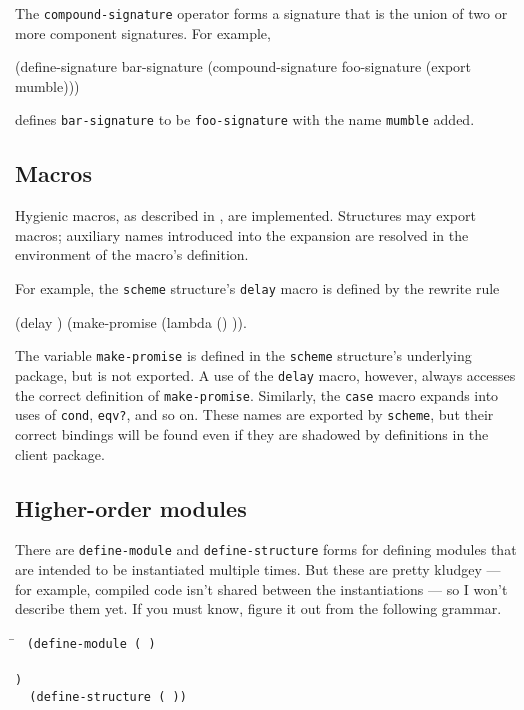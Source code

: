 The {\tt compound-signature} operator forms a signature that is the
union of two or more component signatures.  For example,
\begin{code}
    (define-signature bar-signature
      (compound-signature foo-signature (export mumble)))
\end{code}
defines {\tt bar-signature} to be {\tt foo-signature} with the name
{\tt mumble} added.


\subsection*{Macros}

Hygienic macros, as described in
\cite{Clinger-Rees:Macros,Clinger-Rees:R4RS}, are implemented.
Structures may export macros; auxiliary names introduced into the
expansion are resolved in the environment of the macro's definition.

For example, the {\tt scheme} structure's {\tt delay} macro 
is defined by the rewrite rule
\begin{code}
    (delay )  \xform  (make-promise (lambda () ))\rm.
\end{code}
The variable {\tt make-promise} is defined in the {\tt scheme}
structure's underlying package, but is not exported.  A use of the
{\tt delay} macro, however, always accesses the correct definition
of {\tt make-promise}.  Similarly, the {\tt case} macro expands into
uses of {\tt cond}, {\tt eqv?}, and so on.  These names are exported
by {\tt scheme}, but their correct bindings will be found even if they
are shadowed by definitions in the client package.


\subsection*{Higher-order modules}

There are {\tt define-module} and {\tt define-structure} forms for
defining modules that are intended to be instantiated multiple times.
But these are pretty kludgey --- for example, compiled code isn't
shared between the instantiations --- so I won't describe them yet.
If you must know, figure it out from the following grammar.
\begin{tabbing}
\qquad
    \=\goesto{}~
      \tt(d\=\tt{}efine-module ( ) \\
       \>  \> \\
       \>  \>\tt) \\
	\>\altz{}~ \tt(define-structure 
		        ( ))
\end{tabbing}


